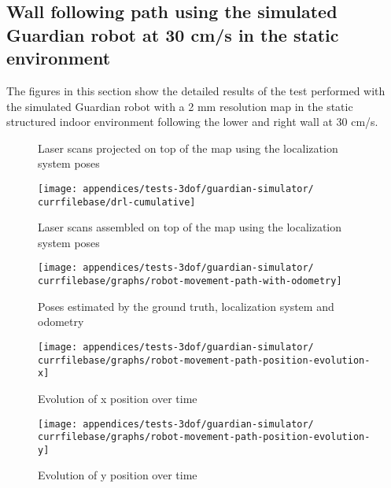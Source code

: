 \subsection{Wall following path using the simulated Guardian robot at 30 cm/s in the static environment}\label{subsec:appendix-a_guardian-simulator-tests_wall-following-path-using-the-simulated-guardian-robot-at-30-cm-s-in-static-environment}

The figures in this section show the detailed results of the test performed with the simulated Guardian robot with a 2 mm resolution map in the static structured indoor environment following the lower and right wall at 30 cm/s.


\begin{figure}[H]
	\centering
	\caption{Laser scans projected on top of the map using the localization system poses}
\end{figure}


\begin{figure}[H]
	\centering
	\texttt{[image: appendices/tests-3dof/guardian-simulator/\\currfilebase/drl-cumulative]}
	\caption{Laser scans assembled on top of the map using the localization system poses}
\end{figure}


\begin{figure}[H]
	\centering
	\texttt{[image: appendices/tests-3dof/guardian-simulator/\\currfilebase/graphs/robot-movement-path-with-odometry]}
	\caption{Poses estimated by the ground truth, localization system and odometry}
\end{figure}

\begin{figure}[H]
	\centering
	\texttt{[image: appendices/tests-3dof/guardian-simulator/\\currfilebase/graphs/robot-movement-path-position-evolution-x]}
	\caption{Evolution of x position over time}
\end{figure}

\begin{figure}[H]
	\centering
	\texttt{[image: appendices/tests-3dof/guardian-simulator/\\currfilebase/graphs/robot-movement-path-position-evolution-y]}
	\caption{Evolution of y position over time}
\end{figure}


